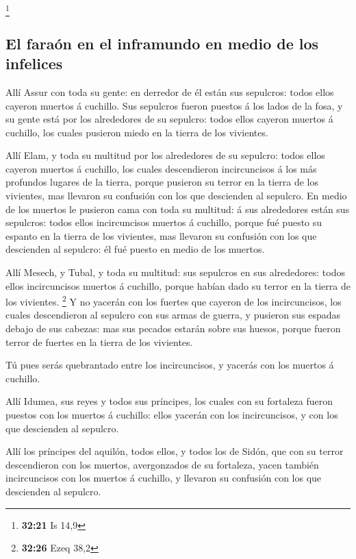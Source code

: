 \footnote{\textbf{32:21} Is 14,9}

\hypertarget{el-farauxf3n-en-el-inframundo-en-medio-de-los-infelices}{%
\subsection{El faraón en el inframundo en medio de los
infelices}\label{el-farauxf3n-en-el-inframundo-en-medio-de-los-infelices}}

 Allí Assur con toda su gente: en derredor de él están
sus sepulcros: todos ellos cayeron muertos á cuchillo. 
Sus sepulcros fueron puestos á los lados de la fosa, y su gente está por
los alrededores de su sepulcro: todos ellos cayeron muertos á cuchillo,
los cuales pusieron miedo en la tierra de los vivientes.

 Allí Elam, y toda su multitud por los alrededores de su
sepulcro: todos ellos cayeron muertos á cuchillo, los cuales
descendieron incircuncisos á los más profundos lugares de la tierra,
porque pusieron su terror en la tierra de los vivientes, mas llevaron su
confusión con los que descienden al sepulcro.  En medio
de los muertos le pusieron cama con toda su multitud: á sus alrededores
están sus sepulcros: todos ellos incircuncisos muertos á cuchillo,
porque fué puesto su espanto en la tierra de los vivientes, mas llevaron
su confusión con los que descienden al sepulcro: él fué puesto en medio
de los muertos.

 Allí Mesech, y Tubal, y toda su multitud: sus sepulcros
en sus alrededores: todos ellos incircuncisos muertos á cuchillo, porque
habían dado su terror en la tierra de los vivientes. \footnote{\textbf{32:26}
  Ezeq 38,2}  Y no yacerán con los fuertes que cayeron de
los incircuncisos, los cuales descendieron al sepulcro con sus armas de
guerra, y pusieron sus espadas debajo de sus cabezas: mas sus pecados
estarán sobre sus huesos, porque fueron terror de fuertes en la tierra
de los vivientes.

 Tú pues serás quebrantado entre los incircuncisos, y
yacerás con los muertos á cuchillo.

 Allí Idumea, sus reyes y todos sus príncipes, los cuales
con su fortaleza fueron puestos con los muertos á cuchillo: ellos
yacerán con los incircuncisos, y con los que descienden al sepulcro.

 Allí los príncipes del aquilón, todos ellos, y todos los
de Sidón, que con su terror descendieron con los muertos, avergonzados
de su fortaleza, yacen también incircuncisos con los muertos á cuchillo,
y llevaron su confusión con los que descienden al sepulcro.

